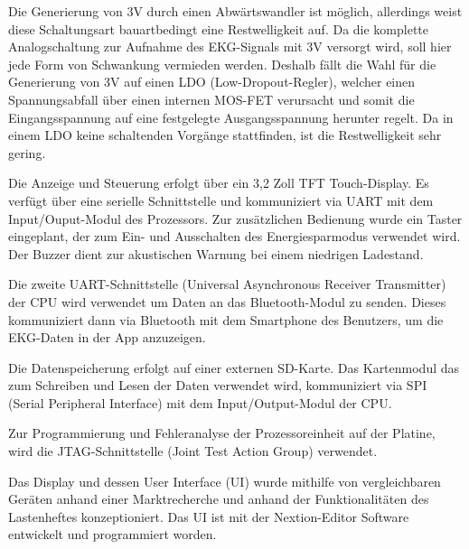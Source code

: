 Die Generierung von 3V durch einen Abwärtswandler ist möglich, allerdings weist diese Schaltungsart bauartbedingt eine Restwelligkeit auf. Da die komplette Analogschaltung zur Aufnahme des EKG-Signals mit 3V versorgt wird, soll hier jede Form von Schwankung vermieden werden.
Deshalb fällt die Wahl für die Generierung von 3V auf einen LDO (Low-Dropout-Regler), welcher einen Spannungsabfall über einen internen MOS-FET verursacht und somit die Eingangsspannung auf eine festgelegte Ausgangsspannung herunter regelt. Da in einem LDO keine schaltenden Vorgänge stattfinden, ist die Restwelligkeit sehr gering.

Die Anzeige und Steuerung erfolgt über ein 3,2 Zoll TFT Touch-Display. Es verfügt über eine serielle Schnittstelle und kommuniziert via UART mit dem Input/Ouput-Modul des Prozessors. Zur zusätzlichen Bedienung wurde ein Taster eingeplant, der zum Ein- und Ausschalten des Energiesparmodus verwendet wird. Der Buzzer dient zur akustischen Warnung bei einem niedrigen Ladestand.

Die zweite UART-Schnittstelle (Universal Asynchronous Receiver Transmitter) der CPU wird verwendet um Daten an das Bluetooth-Modul zu senden. Dieses kommuniziert dann via Bluetooth mit dem Smartphone des Benutzers, um die EKG-Daten in der App anzuzeigen.

Die Datenspeicherung erfolgt auf einer externen SD-Karte. Das Kartenmodul das zum Schreiben und Lesen der Daten verwendet wird, kommuniziert via SPI (Serial Peripheral Interface) mit dem Input/Output-Modul der CPU.

Zur Programmierung und Fehleranalyse der Prozessoreinheit auf der Platine, wird die JTAG-Schnittstelle (Joint Test Action Group) verwendet.

Das Display und dessen User Interface (UI) wurde mithilfe von vergleichbaren Geräten anhand einer Marktrecherche und anhand der Funktionalitäten des Lastenheftes konzeptioniert. Das UI ist mit der Nextion-Editor Software entwickelt und programmiert worden.

